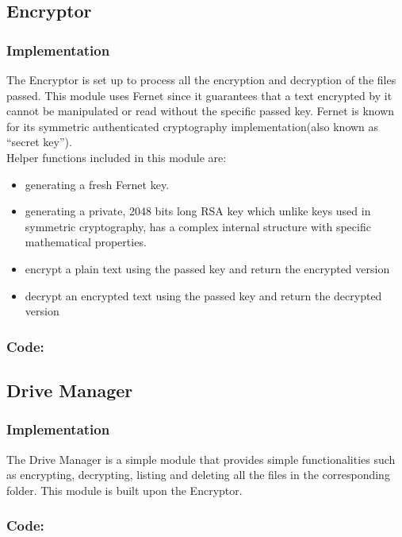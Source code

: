 \documentclass[12pt]{article}
\begin{document}
\subsection*{Encryptor}
\subsubsection*{Implementation}
The Encryptor is set up to process all the encryption and decryption of the files passed. This module uses Fernet since it guarantees that a text encrypted by it cannot be manipulated or read without the specific passed key. Fernet is known for its symmetric authenticated cryptography implementation(also known as “secret key”). \\

Helper functions included in this module are:
\begin{itemize}
\item generating a fresh Fernet key.
\item generating a private, 2048 bits long RSA key which unlike keys used in symmetric cryptography, has a complex internal structure with specific mathematical properties.
\item encrypt a plain text using the passed key and return the encrypted version
\item decrypt an encrypted text using the passed key and  return the decrypted version
\end{itemize} 
\vspace*{10mm}
\subsubsection*{Code:}

\newpage
\subsection*{Drive Manager}
\subsubsection*{Implementation}
The Drive Manager is a simple module that provides simple functionalities such as encrypting, decrypting, listing and deleting all the files in the corresponding folder. This module is built upon the Encryptor. 
\vspace*{10mm}
\subsubsection*{Code:}

\newpage
\end{document}

